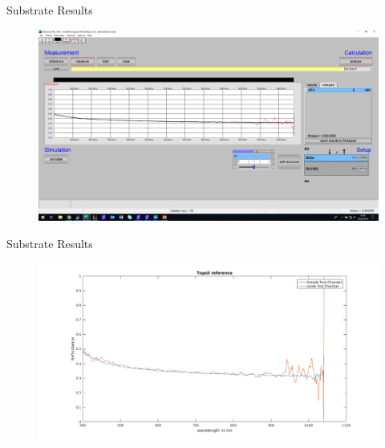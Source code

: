 \documentclass[10pt]{beamer}
\begin{document}
		\begin{frame}{Substrate Results}
			\begin{figure}
			\centering
			\includegraphics[width=\textwidth]{sub2.png}
			\end{figure}
			\end{frame}
			
			\begin{frame}{Substrate Results}
						\begin{figure}
						\centering
						\includegraphics[width=\textwidth]{topsil.png}
						\end{figure}
						\end{frame}
						
\end{document}
